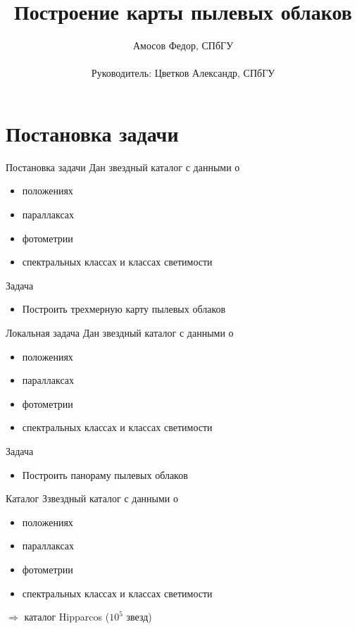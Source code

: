 \documentclass[14pt, fleqn, xcolor={dvipsnames, table}]{beamer}
\title{Построение карты пылевых облаков\\\small{}}
\author[]{
    \small{
        Амосов Федор, СПбГУ\\
        ~\\
        Руководитель: Цветков Александр, СПбГУ
    }
}
\date{}
\begin{document}
    \begin{frame}
        \maketitle
        \small
    \end{frame}

    \section{Постановка задачи}  
    
        \begin{frame}{Постановка задачи}
            Дан звездный каталог с данными о
            \begin{itemize}
                \item положениях
                \item параллаксах
                \item фотометрии
                \item спектральных классах и классах светимости
            \end{itemize}  
            Задача
            \begin{itemize}
                \item Построить трехмерную карту пылевых облаков 
            \end{itemize}         
        \end{frame}
        
        \begin{frame}{Локальная задача}
            Дан звездный каталог с данными о
            \begin{itemize}
                \item положениях
                \item параллаксах
                \item фотометрии
                \item спектральных классах и классах светимости
            \end{itemize}  
            Задача
            \begin{itemize}
                \item Построить панораму пылевых облаков
            \end{itemize}         
        \end{frame}
        
        \begin{frame}{Каталог}
            Ззвездный каталог с данными о
            \begin{itemize}
                \item положениях
                \item параллаксах
                \item фотометрии
                \item спектральных классах и классах светимости
            \end{itemize}  
            $\Longrightarrow$ каталог Hipparcos ($10^5$ звезд)
        \end{frame}
        
\end{document}
